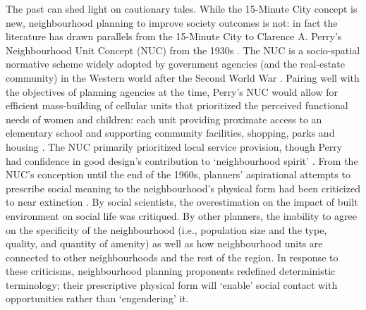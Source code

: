 \documentclass[
  authoryear,
  preprint,
  3p]{elsarticle}
\begin{document}
The past can shed light on cautionary tales. While the 15-Minute City
concept is new, neighbourhood planning to improve society outcomes is
not: in fact the literature has drawn parallels from the 15-Minute City
to Clarence A. Perry's Neighbourhood Unit Concept (NUC) from the 1930s
\citep{kissfazekasCircleParadigms15minute2022}. The NUC is a
socio-spatial normative scheme widely adopted by government agencies
(and the real-estate community) in the Western world after the Second
World War \citep{talenSocialSciencePlanned2017, solow1969concept}.
Pairing well with the objectives of planning agencies at the time,
Perry's NUC would allow for efficient mass-building of cellular units
that prioritized the perceived functional needs of women and children:
each unit providing proximate access to an elementary school and
supporting community facilities, shopping, parks and housing
\citep{talenSocialSciencePlanned2017, brodyNeighbourhoodUnitConcept2013}.
The NUC primarily prioritized local service provision, though Perry had
confidence in good design's contribution to `neighbourhood spirit'
\citep{hall2014cities}. From the NUC's conception until the end of the
1960s, planners' aspirational attempts to prescribe social meaning to
the neighbourhood's physical form had been criticized to near extinction
\citep{talenSocialSciencePlanned2017}. By social scientists, the
overestimation on the impact of built environment on social life was
critiqued. By other planners, the inability to agree on the specificity
of the neighbourhood (i.e., population size and the type, quality, and
quantity of amenity) as well as how neighbourhood units are connected to
other neighbourhoods and the rest of the region. In response to these
criticisms, neighbourhood planning proponents redefined deterministic
terminology; their prescriptive physical form will `enable' social
contact with opportunities rather than `engendering' it.
\end{document}
